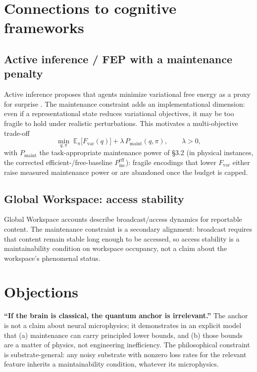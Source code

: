 \documentclass[11pt,a4paper]{article}
\begin{document}
\section{Connections to cognitive frameworks}

\subsection{Active inference / FEP with a maintenance penalty}

Active inference proposes that agents minimize variational free energy as a
proxy for surprise \cite{Friston10,ParrFriston19}. The maintenance constraint
adds an implementational dimension: even if a representational state reduces
variational objectives, it may be too fragile to hold under realistic
perturbations. This motivates a multi-objective trade-off
\begin{equation}
\min_{q,\pi}\; \mathbb{E}_\pi\!\big[F_{\mathrm{var}}(q)\big]
+ \lambda\, P_{\mathrm{maint}}(q,\pi), \qquad \lambda > 0,
\end{equation}
with $P_{\mathrm{maint}}$ the task-appropriate maintenance power of \S3.2
(in physical instances, the corrected efficient-/free-baseline
$P^{\mathrm{eff}}_{\mathrm{inc}}$): fragile
encodings that lower $F_{\mathrm{var}}$ either raise measured maintenance
power or are abandoned once the budget is capped.

\subsection{Global Workspace: access stability}

Global Workspace accounts \cite{Baars88,DehaeneNaccache01,Dehaene14} describe
broadcast/access dynamics for reportable content. The maintenance constraint
is a secondary alignment: broadcast requires that content remain stable long
enough to be accessed, so access stability is a maintainability condition on
workspace occupancy, not a claim about the workspace's phenomenal status.

\section{Objections}

\textbf{``If the brain is classical, the quantum anchor is irrelevant.''} The
anchor is not a claim about neural microphysics; it demonstrates in an
explicit model that (a) maintenance can carry principled lower bounds, and (b)
those bounds are a matter of physics, not engineering inefficiency. The
philosophical constraint is substrate-general: any noisy substrate with
nonzero loss rates for the relevant feature inherits a maintainability
condition, whatever its microphysics.
\end{document}
